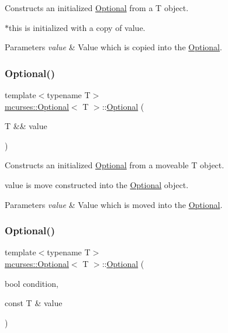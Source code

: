 Constructs an initialized \hyperlink{classmcurses_1_1Optional}{Optional} from a T object. 

$\ast$this is initialized with a copy of {\ttfamily value}. 
\begin{DoxyParams}{Parameters}
{\em value} & Value which is copied into the \hyperlink{classmcurses_1_1Optional}{Optional}. \\
\hline
\end{DoxyParams}
\hypertarget{classmcurses_1_1Optional_acacbd9b1e8a927de478bff6daea6bb96}{}\label{classmcurses_1_1Optional_acacbd9b1e8a927de478bff6daea6bb96} 
\subsubsection{\texorpdfstring{Optional()}{Optional()}\hspace{0.1cm}{\footnotesize\ttfamily [4/10]}}
{\footnotesize\ttfamily template$<$typename T$>$ \\
\hyperlink{classmcurses_1_1Optional}{mcurses\+::\+Optional}$<$ T $>$\+::\hyperlink{classmcurses_1_1Optional}{Optional} (\begin{DoxyParamCaption}\item[{T \&\&}]{value }\end{DoxyParamCaption})\hspace{0.3cm}{\ttfamily [inline]}}



Constructs an initialized \hyperlink{classmcurses_1_1Optional}{Optional} from a moveable T object. 

{\ttfamily value} is move constructed into the \hyperlink{classmcurses_1_1Optional}{Optional} object. 
\begin{DoxyParams}{Parameters}
{\em value} & Value which is moved into the \hyperlink{classmcurses_1_1Optional}{Optional}. \\
\hline
\end{DoxyParams}
\hypertarget{classmcurses_1_1Optional_ae0408366bfb3d0b11ba60004871b863e}{}\label{classmcurses_1_1Optional_ae0408366bfb3d0b11ba60004871b863e} 
\subsubsection{\texorpdfstring{Optional()}{Optional()}\hspace{0.1cm}{\footnotesize\ttfamily [5/10]}}
{\footnotesize\ttfamily template$<$typename T$>$ \\
\hyperlink{classmcurses_1_1Optional}{mcurses\+::\+Optional}$<$ T $>$\+::\hyperlink{classmcurses_1_1Optional}{Optional} (\begin{DoxyParamCaption}\item[{bool}]{condition,  }\item[{const T \&}]{value }\end{DoxyParamCaption})\hspace{0.3cm}{\ttfamily [inline]}}



